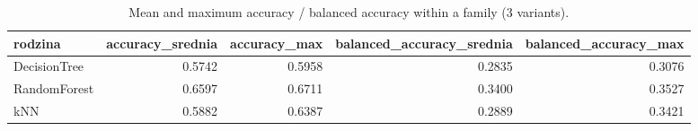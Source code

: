 \begin{table}
\caption{Mean and maximum accuracy / balanced accuracy within a family (3 variants).}
\label{tab:aggregates}
\begin{tabular}{lrrrr}
\toprule
rodzina & accuracy\_srednia & accuracy\_max & balanced\_accuracy\_srednia & balanced\_accuracy\_max \\
\midrule
DecisionTree & 0.5742 & 0.5958 & 0.2835 & 0.3076 \\
RandomForest & 0.6597 & 0.6711 & 0.3400 & 0.3527 \\
kNN & 0.5882 & 0.6387 & 0.2889 & 0.3421 \\
\bottomrule
\end{tabular}
\end{table}
